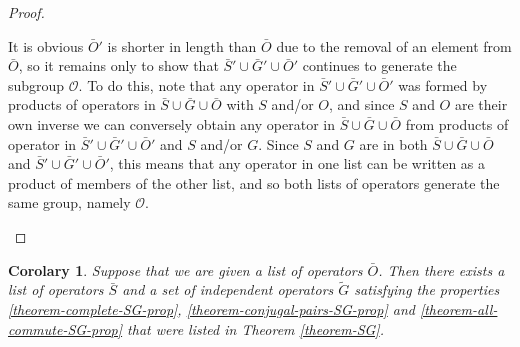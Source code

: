 \documentclass[twocolumn,showpacs,preprintnumbers,amsmath,amssymb,nofootinbib,pra,floatfix]{revtex4}
\newtheorem{corolary}{Corolary}
\newcommand{\lst}{\bar}
\newcommand{\set}{\tilde}
\begin{document}
\begin{proof}
\begin{description}
It is obvious $\lst O'$ is shorter in length than $\lst O$ due to the removal of an element from $\lst O$, so it remains only to show that $\lst S' \cup \lst G' \cup \lst O'$ continues to generate the subgroup $\mathcal{O}$.  To do this, note that any operator in $\lst S' \cup \lst G' \cup \lst O'$ was formed by products of operators in $\lst S \cup \lst G \cup \lst O$ with $S$ and/or $O$, and since $S$ and $O$ are their own inverse we can conversely obtain any operator in $\lst S \cup \lst G \cup \lst O$ from products of operator in $\lst S' \cup \lst G' \cup \lst O'$ and $S$ and/or $G$.  Since $S$ and $G$ are in both $\lst S \cup \lst G \cup \lst O$ and $\lst S' \cup \lst G' \cup \lst O'$, this means that any operator in one list can be written as a product of members of the other list, and so both lists of operators generate the same group, namely $\mathcal{O}$.
\end{description}
\end{proof}

\begin{corolary}
\label{corolary-SG}
Suppose that we are given a list of operators $\lst O$.  Then there exists a list of operators $\lst S$ and a set of independent operators $\set G$ satisfying the properties \ref{theorem-complete-SG-prop}, \ref{theorem-conjugal-pairs-SG-prop} and \ref{theorem-all-commute-SG-prop} that were listed in Theorem \ref{theorem-SG}.
\end{corolary}
\end{document}
